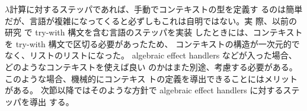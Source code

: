 $\lambda$計算に対するステッパであれば、手動でコンテキストの型を定義す
るのは簡単だが、言語が複雑になってくると必ずしもこれは自明ではない。実
際、以前の研究 \cite{FCA19} で try-with 構文を含む言語のステッパを実装
したときには、コンテキストを try-with 構文で区切る必要があったため、
コンテキストの構造が一次元的でなく、リストのリストになった。
algebraic effect handlers などが入った場合、どのようなコンテキストを使えば良い
のかはまた別途、考慮する必要がある。このような場合、機械的にコンテキス
トの定義を導出できることにはメリットがある。
次節以降ではそのような方針で algebraic effect handlers に対するステッパを導出
する。
